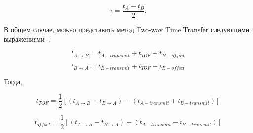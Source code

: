 \begin{equation}
    \label{eq:twtt}
    \tau = \frac{t_A - t_B}{2}.
\end{equation}

В общем случае, можно представить метод Two-way Time Transfer следующими выражениями~\cite{tof:ranging}:

\begin{equation}
    t_{A \to B} = t_{A - transmit} + t_{TOF} + t_{B - offset}
\end{equation}

\begin{equation}
    t_{B \to A} = t_{B - transmit} + t_{TOF} - t_{B - offset}
\end{equation}

Тогда,

\begin{equation}
    t_{TOF} = \frac{1}{2}[(t_{A \to B} + t_{B \to A}) - (t_{A - transmit} + t_{B - transmit})]
\end{equation}

\begin{equation}
    t_{offset} = \frac{1}{2}[(t_{A \to B} - t_{B \to A}) - (t_{A - transmit} - t_{B - transmit})]
\end{equation}




